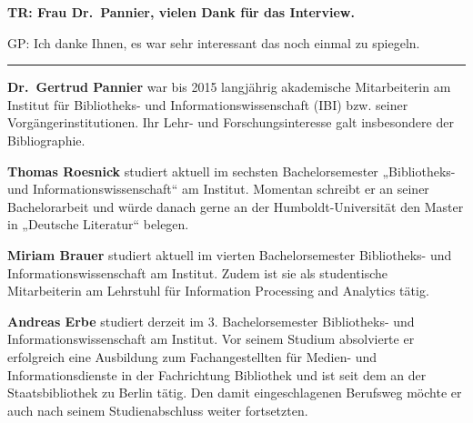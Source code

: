 \documentclass[a4paper,
fontsize=11pt,
oneside,
numbers=noperiodatend,
parskip=half-,
bibliography=totoc,
final
]{scrartcl}
\begin{document}
\textbf{TR: Frau Dr.~Pannier, vielen Dank für das Interview.}

GP: Ich danke Ihnen, es war sehr interessant das noch einmal zu
spiegeln.

\begin{center}\rule{0.5\linewidth}{\linethickness}\end{center}

\textbf{Dr.~Gertrud Pannier} war bis 2015 langjährig akademische
Mitarbeiterin am Institut für Bibliotheks- und Informationswissenschaft
(IBI) bzw. seiner Vorgängerinstitutionen. Ihr Lehr- und
Forschungsinteresse galt insbesondere der Bibliographie.

\textbf{Thomas Roesnick} studiert aktuell im sechsten Bachelorsemester
„Bibliotheks- und Informationswissenschaft`` am Institut. Momentan
schreibt er an seiner Bachelorarbeit und würde danach gerne an der
Humboldt-Universität den Master in „Deutsche Literatur`` belegen.

\textbf{Miriam Brauer} studiert aktuell im vierten Bachelorsemester
Bibliotheks- und Informationswissenschaft am Institut. Zudem ist sie als
studentische Mitarbeiterin am Lehrstuhl für Information Processing and
Analytics tätig.

\textbf{Andreas Erbe} studiert derzeit im 3. Bachelorsemester
Bibliotheks- und Informationswissenschaft am Institut. Vor seinem
Studium absolvierte er erfolgreich eine Ausbildung zum Fachangestellten
für Medien- und Informationsdienste in der Fachrichtung Bibliothek und
ist seit dem an der Staatsbibliothek zu Berlin tätig. Den damit
eingeschlagenen Berufsweg möchte er auch nach seinem Studienabschluss
weiter fortsetzten.
\end{document}
